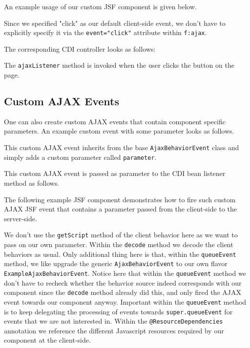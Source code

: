 An example usage of our custom JSF component is given below.

Since we specified "click" as our default client-side event, we don't have to explicitly specify it via the \texttt{event="click"} attribute within \texttt{f:ajax}.

The corresponding CDI controller looks as follows:

The \texttt{ajaxListener} method is invoked when the user clicks the button on the page.

\subsection{Custom AJAX Events}

One can also create custom AJAX events that contain component specific parameters.
An example custom event with some parameter looks as follows.

This custom AJAX event inherits from the base \texttt{AjaxBehaviorEvent} class and simply adds a custom parameter called \texttt{parameter}.

This custom AJAX event is passed as parameter to the CDI bean listener method as follows.


The following example JSF component demonstrates how to fire such custom AJAX JSF event that contains a parameter passed from the client-side to the server-side.

We don't use the \texttt{getScript} method of the client behavior here as we want to pass on our own parameter.
Within the \texttt{decode} method we decode the client behaviors as usual.
Only additional thing here is that, within the \texttt{queueEvent} method, we like upgrade the generic \texttt{AjaxBehaviorEvent} to our own flavor \texttt{ExampleAjaxBehaviorEvent}.
Notice here that within the \texttt{queueEvent} method we don't have to recheck whether the behavior source indeed corresponds with our component since the \texttt{decode} method already did this, and only fired the AJAX event towards our component anyway.
Important within the \texttt{queueEvent} method is to keep delegating the processing of events towards \texttt{super.queueEvent} for events that we are not interested in.
Within the \texttt{@ResourceDependencies} annotation we reference the different Javascript resources required by our component at the client-side.

